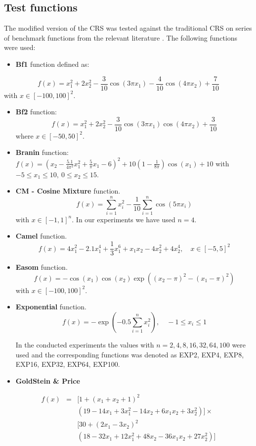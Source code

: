 \documentclass[symmetry,article,submit,moreauthors,pdftex]{Definitions/mdpi}
\begin{document}
\subsection{Test functions }

The modified version of the CRS was tested against the traditional
CRS on series of benchmark functions from the relevant literature
\cite{Ali1,Floudas1}. The following functions were used: 
\begin{itemize}
\item \textbf{Bf1} function defined as:

\end{itemize}
\[
f(x)=x_{1}^{2}+2x_{2}^{2}-\frac{3}{10}\cos\left(3\pi x_{1}\right)-\frac{4}{10}\cos\left(4\pi x_{2}\right)+\frac{7}{10}
\]
with $x\in[-100,100]^{2}$. 
\begin{itemize}
\item \textbf{Bf2} function:
\[
f(x)=x_{1}^{2}+2x_{2}^{2}-\frac{3}{10}\cos\left(3\pi x_{1}\right)\cos\left(4\pi x_{2}\right)+\frac{3}{10}
\]
where $x\in[-50,50]^{2}$. 
\item \textbf{Branin} function:
$f(x)=\left(x_{2}-\frac{5.1}{4\pi^{2}}x_{1}^{2}+\frac{5}{\pi}x_{1}-6\right)^{2}+10\left(1-\frac{1}{8\pi}\right)\cos(x_{1})+10$
with $-5\le x_{1}\le10,\ 0\le x_{2}\le15$.
\item \textbf{CM - Cosine Mixture} function. 
\[
f(x)=\sum_{i=1}^{n}x_{i}^{2}-\frac{1}{10}\sum_{i=1}^{n}\cos\left(5\pi x_{i}\right)
\]
with $x\in[-1,1]^{n}$. In our experiments we have used $n=4$.
\item \textbf{Camel} function. 
\[
f(x)=4x_{1}^{2}-2.1x_{1}^{4}+\frac{1}{3}x_{1}^{6}+x_{1}x_{2}-4x_{2}^{2}+4x_{2}^{4},\quad x\in[-5,5]^{2}
\]
\item \textbf{Easom} function. 
\[
f(x)=-\cos\left(x_{1}\right)\cos\left(x_{2}\right)\exp\left(\left(x_{2}-\pi\right)^{2}-\left(x_{1}-\pi\right)^{2}\right)
\]
with $x\in[-100,100]^{2}.$ 
\item \textbf{Exponential} function. 
\[
f(x)=-\exp\left(-0.5\sum_{i=1}^{n}x_{i}^{2}\right),\quad-1\le x_{i}\le1
\]

In the conducted experiments the values with $n=2,4,8,16,32,64,100$ were used and the corresponding functions was denoted as EXP2, EXP4,
EXP8, EXP16, EXP32, EXP64, EXP100.
\item \textbf{GoldStein \& Price }
\end{itemize}
\begin{eqnarray*}
f(x) & = & [1+(x_{1}+x_{2}+1)^{2}\\
 &  & (19-14x_{1}+3x_{1}^{2}-14x_{2}+6x_{1}x_{2}+3x_{2}^{2})]\times\\
 &  & [30+(2x_{1}-3x_{2})^{2}\\
 &  & (18-32x_{1}+12x_{1}^{2}+48x_{2}-36x_{1}x_{2}+27x_{2}^{2})]
\end{eqnarray*}
\end{document}
